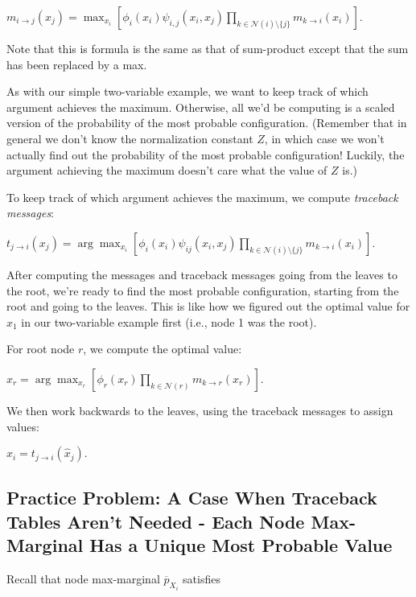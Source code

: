\documentclass[6008notes.tex]{subfiles}
\begin{document}
{\centering$m_{i \to j}(x_ j) = \max _{x_ i} \left[ \phi _ i(x_ i) \psi _{i,j}(x_ i,x_ j) \prod _{k \in \mathcal{N}(i) \setminus \{ j\} } m_{k \to i}(x_ i) \right].$ \par}
 
Note that this is formula is the same as that of sum-product except that the sum has been replaced by a max.

As with our simple two-variable example, we want to keep track of which argument achieves the maximum. Otherwise, all we'd be computing is a scaled version of the probability of the most probable configuration. (Remember that in general we don't know the normalization constant $Z$, in which case we won't actually find out the probability of the most probable configuration! Luckily, the argument achieving the maximum doesn't care what the value of $Z$ is.)

To keep track of which argument achieves the maximum, we compute \textit{traceback messages}:

{\centering$t_{j \to i}(x_ j) = \arg \max _{x_ i} \left[ \phi _ i(x_ i) \psi _{ij}(x_ i,x_ j) \prod _{k \in \mathcal{N}(i) \setminus \{ j\} } m_{k \to i}(x_ i) \right].$ \par}
 
After computing the messages and traceback messages going from the leaves to the root, we're ready to find the most probable configuration, starting from the root and going to the leaves. This is like how we figured out the optimal value for $x_1$ in our two-variable example first (i.e., node 1 was the root).

For root node $r$, we compute the optimal value:

{\centering$\hat{x}_ r = \arg \max _{x_ r} \left[\phi _ r(x_ r) \prod _{k \in \mathcal{N}(r)} m_{k \to r}(x_ r) \right].$ \par}
 
We then work backwards to the leaves, using the traceback messages to assign values:

{\centering$\hat{x}_ i = t_{j \to i}(\hat{x}_ j).$ \par}
 

\subsection{Practice Problem: A Case When Traceback Tables Aren't Needed - Each Node Max-Marginal Has a Unique Most Probable Value}

Recall that node max-marginal $\overline{p}_{X_ i}$ satisfies
\end{document}
